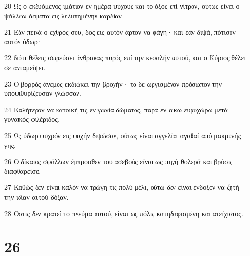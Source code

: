 \par 20 Ως ο εκδυόμενος ιμάτιον εν ημέρα ψύχους και το όξος επί νίτρον, ούτως είναι ο ψάλλων άσματα εις λελυπημένην καρδίαν.
\par 21 Εάν πεινά ο εχθρός σου, δος εις αυτόν άρτον να φάγη· και εάν διψά, πότισον αυτόν ύδωρ·
\par 22 διότι θέλεις σωρεύσει άνθρακας πυρός επί την κεφαλήν αυτού, και ο Κύριος θέλει σε ανταμείψει.
\par 23 Ο βορράς άνεμος εκδιώκει την βροχήν· το δε ωργισμένον πρόσωπον την υποψιθυρίζουσαν γλώσσαν.
\par 24 Καλήτερον να κατοική τις εν γωνία δώματος, παρά εν οίκω ευρυχώρω μετά γυναικός φιλέριδος.
\par 25 Ως ύδωρ ψυχρόν εις ψυχήν διψώσαν, ούτως είναι αγγελίαι αγαθαί από μακρυνής γης.
\par 26 Ο δίκαιος σφάλλων έμπροσθεν του ασεβούς είναι ως πηγή θολερά και βρύσις διαφθαρείσα.
\par 27 Καθώς δεν είναι καλόν να τρώγη τις πολύ μέλι, ούτω δεν είναι ένδοξον να ζητή την ιδίαν αυτού δόξαν.
\par 28 Όστις δεν κρατεί το πνεύμα αυτού, είναι ως πόλις κατηδαφισμένη και ατείχιστος.

\chapter{26}

